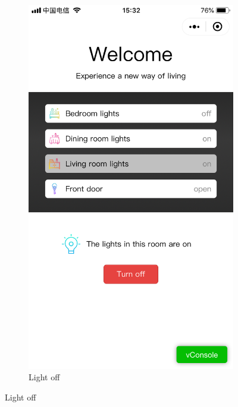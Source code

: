 \documentclass[12pt,a4paper]{report}
\begin{document}
\begin{figure}[H]
\begin{subfigure}{.3\textwidth}
	\includegraphics[width=.8\linewidth]{figures/3.png}
	\caption{Light off}
\end{subfigure}
\end{figure}
\end{document}
